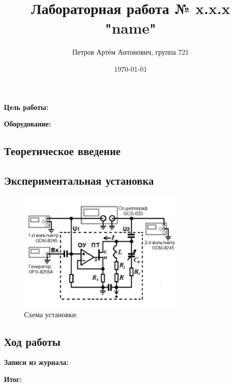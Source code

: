 \documentclass[a4paper,12pt]{article}
\author{Петров Артём Антонович, группа 721}
\title{Лабораторная работа № x.x.x "name"}
\date{\today}
\begin{document}

\begin{minipage}[t][5cm]{\textwidth}
\maketitle
\end{minipage}


\textbf{Цель работы:} 
\bigskip

\medskip
\textbf{Оборудование:} 
\bigskip

\subsection*{Теоретическое введение}
\bigskip


\bigskip

\subsection*{Экспериментальная установка}
\bigskip


\begin{figure}[ht]
\centering
\includegraphics[width=80mm]{scheme.png}
\caption{Схема установки: }\label{schema}
\end{figure}

\bigskip

\subsection*{Ход работы}
\bigskip


\bigskip

\textbf{Записи из журнала:}
\bigskip


\bigskip

\textbf{Итог:}
\bigskip
 
\end{document}
